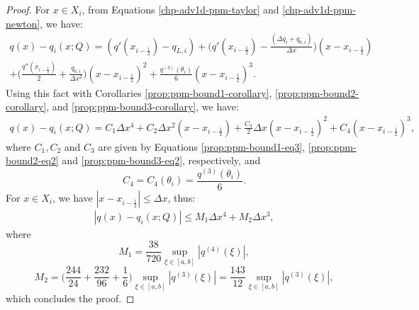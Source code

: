 \begin{proof}
	For $x \in X_i$, from Equations \eqref{chp-adv1d-ppm-taylor} and \eqref{chp-adv1d-ppm-newton}, we have:
	\begin{equation*}
		\begin{split}
			q(x)-q_i(x;Q) = (q'(x_{i-\frac{i}{2}})-q_{L,i})	
			+ \bigg(q'(x_{i-\frac{1}{2}})-  \frac{(\Delta q_i + q_{6, i})}{\Delta x}\bigg)(x-x_{i-\frac{1}{2}})
			\\+ \bigg(\frac{q''(x_{i-\frac{1}{2}})}{2} + \frac{q_{6, i}}{\Delta x^2}\bigg)(x-x_{i-\frac{1}{2}})^2
			+ \frac{q^{(3)}(\theta_i)}{6}(x-x_{i-\frac{1}{2}})^3.
		\end{split}
	\end{equation*}
	Using this fact with Corollaries \ref{prop:ppm-bound1-corollary}, \ref{prop:ppm-bound2-corollary},
	and  \ref{prop:ppm-bound3-corollary}, we have:
	\begin{equation*}
		\begin{split}
			q(x)-q_i(x;Q) =  C_1 \Delta x ^4 + C_2 \Delta x ^2(x-x_{i-\frac{1}{2}})
			+ \frac{C_3}{2} \Delta x (x-x_{i-\frac{1}{2}})^2
			+ C_4(x-x_{i-\frac{1}{2}})^3,
		\end{split}
	\end{equation*}
	where $C_1, C_2$ and $C_3$ are given by Equations \eqref{prop:ppm-bound1-eq3},
	\eqref{prop:ppm-bound2-eq2} and \eqref{prop:ppm-bound3-eq2}, respectively, and
	\begin{equation}
		\label{prop:ppm-bound4-eq3}
		C_4 = C_4(\theta_i) = \frac{q^{(3)}(\theta_i)}{6}.
	\end{equation}
	For $x\in X_i$, we have $|x -x_{i-\frac{i}{2}}| \leq \Delta x$, thus:
	\begin{equation*}
		\begin{split}
			|q(x)-q_i(x;Q)| \leq  M_1 \Delta x ^4 + M_2 \Delta x ^3,
		\end{split}
	\end{equation*}
	where 
	\begin{equation*}
		M_1 = \frac{38}{720}\sup_{\xi \in [a,b]} |q^{(4)}(\xi)|, 
	\end{equation*}
	\begin{equation*}
		M_2 = \bigg(\frac{244}{24} + \frac{232}{96} + \frac{1}{6} \bigg)
		\sup_{\xi \in [a,b]} |q^{(3)}(\xi)| = \frac{143}{12} \sup_{\xi \in [a,b]} |q^{(3)}(\xi)|,
	\end{equation*}
	which concludes the proof.
\end{proof}



